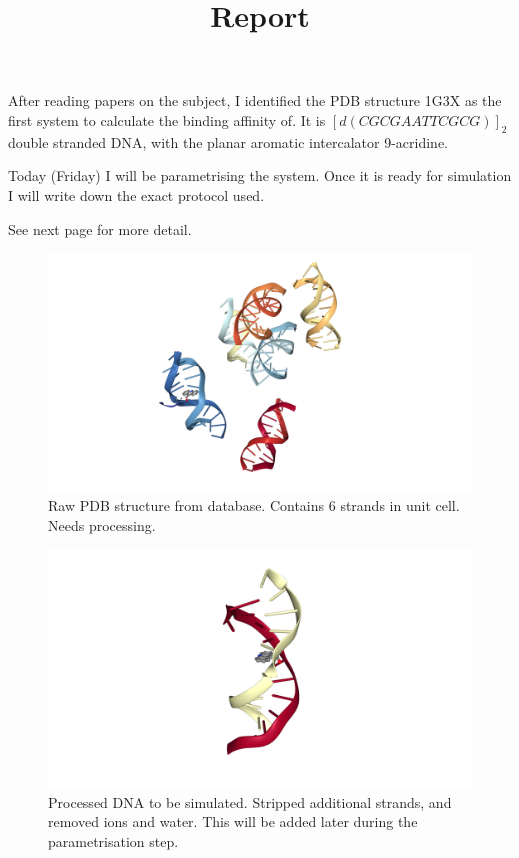 \documentclass{article}
\date{\displaydate{date}}
\title{Report}
\begin{document}
\maketitle

After reading papers on the subject, I identified the PDB structure 1G3X as the first system to calculate the binding affinity of. It is $[d(CGCGAATTCGCG)]_2$ double stranded DNA, with the planar aromatic intercalator 9-acridine.

Today (Friday) I will be parametrising the system. Once it is ready for simulation I will write down the exact protocol used.

See next page for more detail.

\begin{figure}
  \includegraphics[width=\textwidth]{1g3x.png}
  \caption{Raw PDB structure from database. Contains 6 strands in unit cell. Needs processing.}
  \label{fig:pdb-1}
\end{figure}

\begin{figure}
  \includegraphics[width=\textwidth]{1g3x_clean.png}
  \caption{Processed DNA to be simulated. Stripped additional strands, and removed ions and water. This will be added later during the parametrisation step.}
  \label{fig:pdb-2}
\end{figure}
\end{document}
